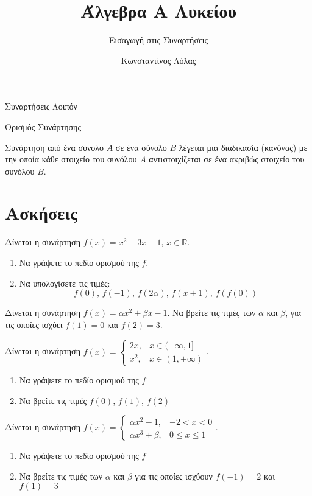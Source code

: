 \documentclass{../../presentation}
\title{Άλγεβρα Α Λυκείου}
\subtitle{Εισαγωγή στις Συναρτήσεις}
\author[Λόλας]{Κωνσταντίνος Λόλας}
\date{}
\begin{document}
\frame{\titlepage}

\begin{frame}{Συναρτήσεις Λοιπόν}

\end{frame}

\begin{frame}{Ορισμός Συνάρτησης}
  \begin{definition}
    Συνάρτηση από ένα σύνολο $Α$ σε ένα σύνολο $Β$ λέγεται μια διαδικασία (κανόνας) με την οποία κάθε στοιχείο του συνόλου $Α$ αντιστοιχίζεται σε ένα ακριβώς στοιχείο του συνόλου $Β$.
  \end{definition}
\end{frame}

\section{Ασκήσεις}

\begin{askisi}
  Δίνεται η συνάρτηση $f(x)=x^2-3x-1$, $x\in\mathbb{R}$.
  \begin{enumerate}[<+->]
    \item Να γράψετε το πεδίο ορισμού της $f$.
    \item Να υπολογίσετε τις τιμές:
          $$f(0) \text{, } f(-1) \text{, }f(2α) \text{, }f(x+1) \text{, }f\left(f(0)\right) $$
  \end{enumerate}
\end{askisi}

\begin{askisi}
  Δίνεται η συνάρτηση $f(x)=αx^2+βx-1$. Να βρείτε τις τιμές των $α$ και $β$, για τις οποίες ισχύει $f(1)=0$ και $f(2)=3$.
\end{askisi}

\begin{askisi}
  Δίνεται η συνάρτηση $f(x)=
    \begin{cases}
      2x,  & x\in(-\infty,1] \\
      x^2, & x\in(1,+\infty)
    \end{cases}$.
  \begin{enumerate}[<+->]
    \item Να γράψετε το πεδίο ορισμού της $f$
    \item Να βρείτε τις τιμές $f(0)$, $f(1)$, $f(2)$
  \end{enumerate}
\end{askisi}

\begin{askisi}
  Δίνεται η συνάρτηση $f(x)=
    \begin{cases}
      αx^2-1, & -2<x<0      \\
      αx^3+β, & 0\le x\le 1
    \end{cases}$.
  \begin{enumerate}[<+->]
    \item Να γράψετε το πεδίο ορισμού της $f$
    \item Να βρείτε τις τιμές των $α$ και $β$ για τις οποίες ισχύουν $f(-1)=2$ και $f(1)=3$
  \end{enumerate}
\end{askisi}
\end{document}
